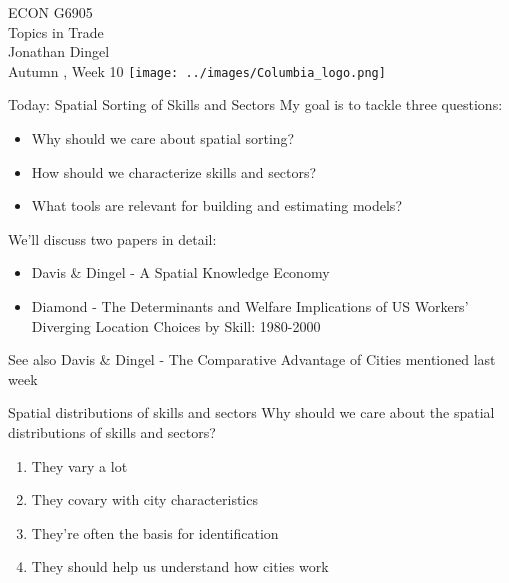 \documentclass[11pt,notes=hide,aspectratio=169]{beamer}
\begin{document}
\begin{frame}[plain]
\begin{center}
\large
\textcolor{columbiadarkblue}{ECON G6905\\
Topics in Trade\\ 
Jonathan Dingel\\
Autumn \the\year, Week 10}
\vfill 
\texttt{[image: ../images/Columbia\_logo.png]}
\end{center}
\end{frame}
\begin{frame}{Today: Spatial Sorting of Skills and Sectors}
My goal is to tackle three questions:
\begin{itemize}
	\item Why should we care about spatial sorting?
	\item How should we characterize skills and sectors?
	\item What tools are relevant for building and estimating models?
\end{itemize}
\vspace{5mm}
We'll discuss two papers in detail:
\begin{itemize}
	\item Davis \& Dingel - A Spatial Knowledge Economy
	\item Diamond - The Determinants and Welfare Implications of US Workers' Diverging Location Choices by Skill: 1980-2000 
\end{itemize}
See also Davis \& Dingel - The Comparative Advantage of Cities mentioned last week
\end{frame}
\begin{frame}{Spatial distributions of skills and sectors} 
Why should we care about the spatial distributions of skills and sectors?
\begin{enumerate}
	\item They vary a lot
	\item They covary with city characteristics
	\item They're often the basis for identification 
	\item They should help us understand how cities work
\end{enumerate}
\end{frame}
\end{document}
